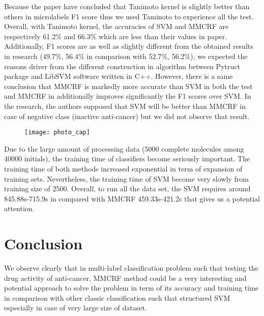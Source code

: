 \documentclass[12pt]{article}
\begin{document}
Because the paper have concluded that Tanimoto kernel is slightly better than others in microlabels F1 score thus we used Taminoto to experience all the test. Overall, with Tanimoto kernel, the accuracies of SVM and MMCRF are respectively 61.2\% and 66.3\% which are less than their values in paper. Additionally, F1 scores are as well as slightly different from the obtained results in research (49.7\%, 56.4\% in comparison with 52.7\%, 56.2\%), we expected the reasons driver from the different construction in algorithm between Pytruct package and LibSVM software written in C++. However, there is a same conclusion that MMCRF is markedly more accurate than SVM in both the test and MMCRF in additionally improves significantly the F1 scores over SVM. In the research, the authors supposed that SVM will be better than MMCRF in case of negative class (inactive anti-cancer) but we did not observe that result. 
\begin{figure}[ht]
	\centering
	\texttt{[image: photo\_cap]}	
\end{figure}
\newpage
Due to the large amount of processing data (5000 complete molecules among 40000 initials), the training time of classifiers become seriously important. The training time of both methods increased exponential in term of expansion of training sets. Nevertheless, the training time of SVM become very slowly from training size of 2500. Overall, to run all the data set, the SVM requires around 845.88s-715.9s in compared with MMCRF 459.33s-421.2s that gives us a potential attention.




\section*{Conclusion}
We observe clearly that in multi-label classification problem such that testing the drug activity of anti-cancer, MMCRF method could be a very interesting and potential approach to solve the problem in term of its accuracy and training time in comparison with other classic classification such that structured SVM especially in case of very large size of dataset. \\
\end{document}
